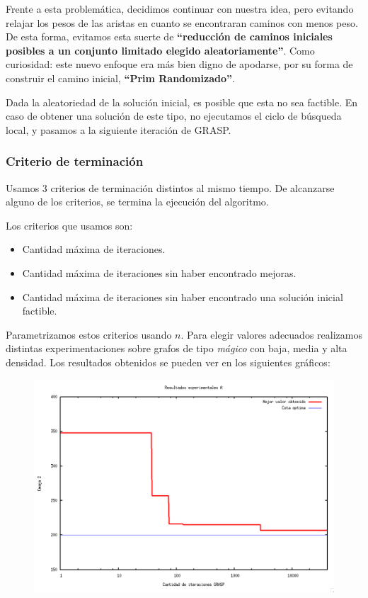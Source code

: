 Frente a esta problemática, decidimos continuar con nuestra idea, pero evitando relajar los pesos de las aristas en cuanto se encontraran caminos con menos peso. De esta forma, evitamos esta suerte de \textbf{``reducción de caminos iniciales posibles a un conjunto limitado elegido aleatoriamente''}. Como curiosidad: este nuevo enfoque era más bien digno de apodarse, por su forma de construir el camino inicial, \textbf{``Prim Randomizado''}.

Dada la aleatoriedad de la solución inicial, es posible que esta no sea factible. En caso de obtener una solución de este tipo, no ejecutamos el ciclo de búsqueda local, y pasamos a la siguiente iteración de GRASP.

\subsubsection{Criterio de terminación}

Usamos 3 criterios de terminación distintos al mismo tiempo. De alcanzarse alguno de los criterios, se termina la ejecución del algoritmo.

Los criterios que usamos son:
\begin{itemize}
\item Cantidad máxima de iteraciones.
\item Cantidad máxima de iteraciones sin haber encontrado mejoras.
\item Cantidad máxima de iteraciones sin haber encontrado una solución inicial factible.
\end{itemize}

Parametrizamos estos criterios usando $n$. Para elegir valores adecuados realizamos distintas experimentaciones sobre grafos de tipo \textit{mágico} con baja, media y alta densidad. Los resultados obtenidos se pueden ver en los siguientes gráficos:

\begin{figure}[H]
\begin{center}
\includegraphics[angle=0, scale=.5]{imagenes/iteraciones-GRASP-A.png}
\label{Resultados experimentales A}
\end{center}
\end{figure}

